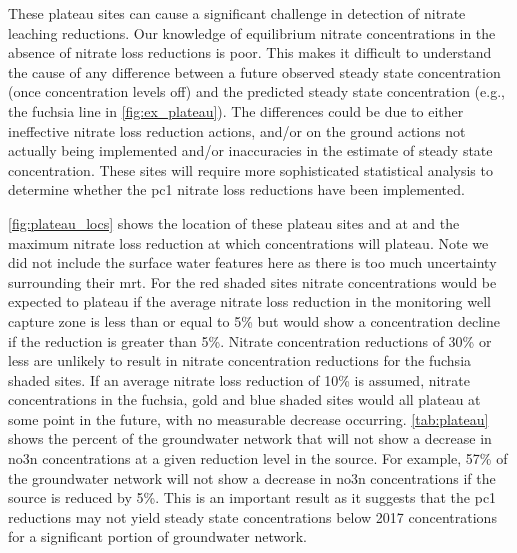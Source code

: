 
These plateau sites can cause a significant challenge in detection of nitrate leaching reductions.
Our knowledge of equilibrium nitrate concentrations in the absence of nitrate loss reductions is poor.
This makes it difficult to understand the cause of any difference between a future observed steady state concentration (once concentration levels off) and the predicted steady state concentration (e.g., the fuchsia line in \autoref{fig:ex_plateau}).
The differences could be due to either ineffective nitrate loss reduction actions, and/or on the ground actions not actually being implemented and/or inaccuracies in the estimate of steady state concentration.
These sites will require more sophisticated statistical analysis to determine whether the \gls{pc1} nitrate loss reductions have been implemented.



\autoref{fig:plateau_locs} shows the location of these plateau sites and at and the maximum nitrate loss reduction at which concentrations will plateau.
Note we did not include the surface water features here as there is too much uncertainty surrounding their \gls{mrt}.
For the red shaded sites nitrate concentrations would be expected to plateau if the average nitrate loss reduction in the monitoring well capture zone is less than or equal to 5\% but would show a concentration decline if the reduction is greater than 5\%.
Nitrate concentration reductions of 30\% or less are unlikely to result in nitrate concentration reductions for the fuchsia shaded sites.
If an average nitrate loss reduction of 10\% is assumed, nitrate concentrations in the fuchsia, gold and blue shaded sites would all plateau at some point in the future, with no measurable decrease occurring.
\autoref{tab:plateau} shows the percent of the groundwater network that will not show a decrease in \gls{no3n} concentrations at a given reduction level in the source.
For example, 57\% of the groundwater network will not show a decrease in \gls{no3n} concentrations if the source is reduced by 5\%.
This is an important result as it suggests that the \gls{pc1} reductions may not yield steady state concentrations below 2017 concentrations for a significant portion of groundwater network.

\begin{landscape}
\end{landscape}

